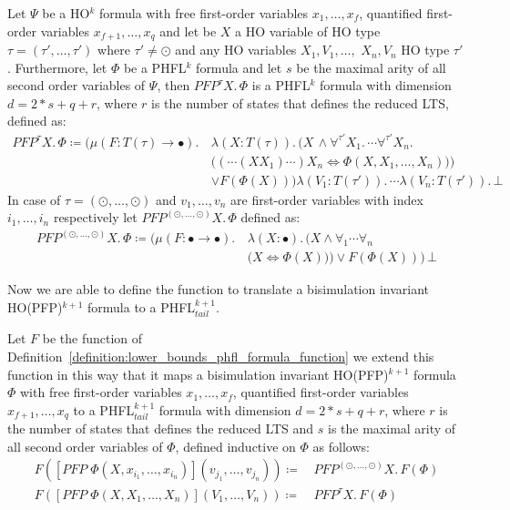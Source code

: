 \begin{definition}
Let $\Psi$ be a HO$^k$ formula with free first-order variables $x_1, \dots, x_f$, quantified first-order variables $x_{f+1}, \dots,
    x_q$ and let be $X$ a HO variable of HO type $\tau = (\tau', \dots, \tau')$ where $\tau' \neq \odot$ and any HO variables
    $X_1, V_1, \dots, $ $X_n, V_n$ HO type $\tau'$. Furthermore, let
    $\Phi$ be a PHFL$^k$
    formula and let $s$ be the maximal arity
    of all second order variables of $\Psi$, then $PFP^\tau X.\,\Phi$
    is a PHFL$^k$ formula with dimension $d = 2 * s + q + r$, where $r$ is the number of states that defines the reduced LTS,  defined as:
    \begin{align*}
     PFP^\tau X. \, \Phi \coloneqq \big(\mu (F \colon T(\tau) \rightarrow \bullet).\,&\lambda (X \colon T(\tau)).\, \big(X\,\wedge \forall^{\tau'}X_1.\, \dotsb \forall^{\tau'}X_n.\, \\&\big( (\dotsb (X X_1) \dotsb) X_n \Leftrightarrow \Phi(X, X_1, \dots, X_n) \big)\big)\\& \vee F(\Phi(X))\big)\lambda (V_1 \colon T(\tau')).\, \dotsb \lambda (V_n \colon T(\tau')).\,\bot
\end{align*}    
    In case of $\tau = (\odot, \dots, \odot)$ and $v_1, \dots, v_n$ are first-order variables with index $i_1, \dots, i_n$ respectively let $PFP^{(\odot, \dots, \odot)} X.\,\Phi$ defined as:
    \begin{align*}
    PFP^{(\odot, \dots, \odot)} X.\,\Phi \coloneqq \big(\mu (F \colon \bullet \rightarrow \bullet).\,&\lambda (X \colon \bullet).\, \big(X \wedge \forall_1 \dotsb \forall_n \\&\big(X \Leftrightarrow \Phi(X)\big)\big) \vee F(\Phi(X))\big)\,\bot
    \end{align*}
\end{definition}

Now we are able to define the function to translate a bisimulation invariant HO(PFP)$^{k+1}$
formula to a PHFL$^{k+1}_{tail}$. 

\begin{definition}
    \label{definition:lower_bounds_phfl_formula_function_pfp}
    Let $F$ be the function of Definition~\ref{definition:lower_bounds_phfl_formula_function} we extend this function in this way that it maps a bisimulation invariant HO(PFP)$^{k+1}$ formula $\Phi$ with free first-order variables $x_1, \dots, x_f$, quantified first-order variables $x_{f+1}, \dots,
    x_q$ to a PHFL$^{k+1}_{tail}$ formula with dimension $d = 2 * s + q + r$, where $r$ is the number of states that defines the reduced LTS and $s$ is the maximal arity
    of all second order variables of $\Phi$, defined
    inductive on $\Phi$ as follows:
    \begin{align*}
        F([PFP\;\Phi(X, x_{i_1}, \dots, x_{i_n})](v_{j_1}, \dots, v_{j_n})) \coloneqq &\,PFP^{(\odot, \dots, \odot)} X.\, F(\Phi) \\
        F([PFP\;\Phi(X, X_1, \dots, X_n)](V_1, \dots, V_n)) \coloneqq &\,PFP^\tau X.\, F(\Phi) 
    \end{align*}
\end{definition}

